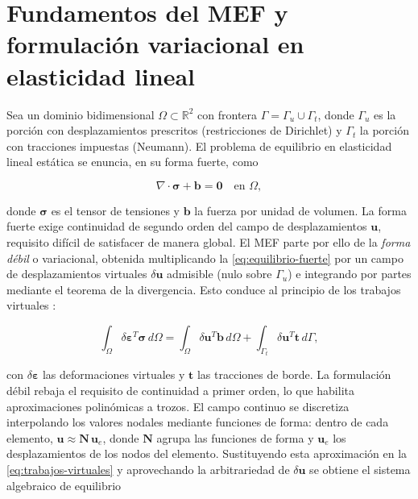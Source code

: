 \section{Fundamentos del MEF y formulación variacional en elasticidad lineal}
\label{sec:formulacion-debil}

Sea un dominio bidimensional $\Omega \subset \mathbb{R}^2$ con frontera $\Gamma = \Gamma_u \cup \Gamma_t$, donde $\Gamma_u$ es la porción con desplazamientos prescritos (restricciones de Dirichlet) y $\Gamma_t$ la porción con tracciones impuestas (Neumann). El problema de equilibrio en elasticidad lineal estática se enuncia, en su forma fuerte, como

\begin{equation}
\nabla \cdot \bm{\sigma} + \bm{b} = \bm{0} \quad \text{en } \Omega,
\label{eq:equilibrio-fuerte}
\end{equation}

donde $\bm{\sigma}$ es el tensor de tensiones y $\bm{b}$ la fuerza por unidad de volumen. La forma fuerte exige continuidad de segundo orden del campo de desplazamientos $\bm{u}$, requisito difícil de satisfacer de manera global. El MEF parte por ello de la \emph{forma débil} o variacional, obtenida multiplicando la \autoref{eq:equilibrio-fuerte} por un campo de desplazamientos virtuales $\delta\bm{u}$ admisible (nulo sobre $\Gamma_u$) e integrando por partes mediante el teorema de la divergencia. Esto conduce al principio de los trabajos virtuales \autocites[pp.~69-71]{zienkiewicz2013fem}[pp.~77-79]{hughes2000fem}[pp.~612-613]{reddy2006introduction}:

\begin{equation}
\int_\Omega \delta\bm{\varepsilon}^{T} \bm{\sigma} \, d\Omega
= \int_\Omega \delta\bm{u}^{T} \bm{b} \, d\Omega
+ \int_{\Gamma_t} \delta\bm{u}^{T} \bm{t} \, d\Gamma,
\label{eq:trabajos-virtuales}
\end{equation}

con $\delta\bm{\varepsilon}$ las deformaciones virtuales y $\bm{t}$ las tracciones de borde. La formulación débil rebaja el requisito de continuidad a primer orden, lo que habilita aproximaciones polinómicas a trozos. El campo continuo se discretiza interpolando los valores nodales mediante funciones de forma: dentro de cada elemento, $\bm{u} \approx \bm{N}\,\bm{u}_e$, donde $\bm{N}$ agrupa las funciones de forma y $\bm{u}_e$ los desplazamientos de los nodos del elemento. Sustituyendo esta aproximación en la \autoref{eq:trabajos-virtuales} y aprovechando la arbitrariedad de $\delta\bm{u}$ se obtiene el sistema algebraico de equilibrio

